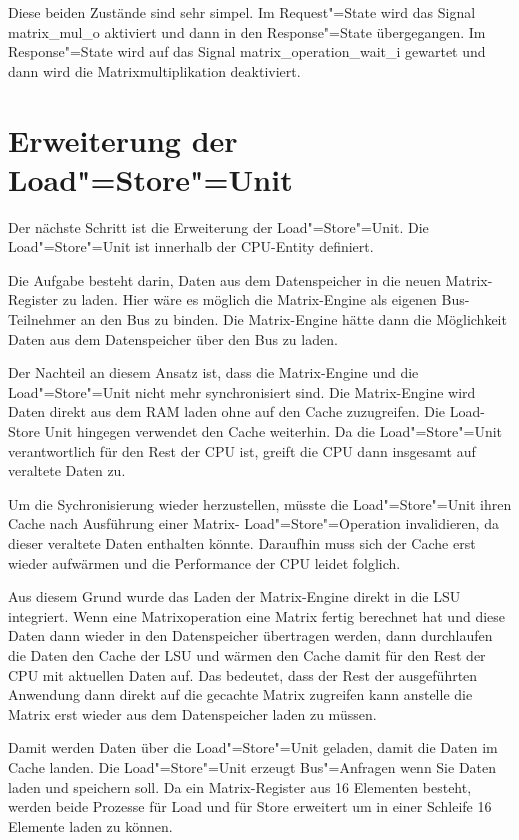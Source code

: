 Diese beiden Zustände sind sehr simpel. Im Request"=State wird das Signal matrix\_mul\_o aktiviert und dann in den Response"=State übergegangen. Im Response"=State wird auf das Signal matrix\_operation\_wait\_i gewartet und dann wird die Matrixmultiplikation deaktiviert.




\section{Erweiterung der Load"=Store"=Unit} \label{sec:neorv32-extending-LSU}

Der nächste Schritt ist die Erweiterung der Load"=Store"=Unit. Die Load"=Store"=Unit ist innerhalb der CPU-Entity definiert.

Die Aufgabe besteht darin, Daten aus dem Datenspeicher in die neuen Matrix-Register zu laden. Hier wäre es möglich die Matrix-Engine als eigenen Bus-Teilnehmer an den Bus zu binden. Die Matrix-Engine hätte dann die Möglichkeit Daten aus dem Datenspeicher über den Bus zu laden.

Der Nachteil an diesem Ansatz ist, dass die Matrix-Engine und die Load"=Store"=Unit nicht mehr synchronisiert sind. Die Matrix-Engine wird Daten direkt aus dem RAM laden ohne auf den Cache zuzugreifen. Die Load-Store Unit hingegen verwendet den Cache weiterhin. Da die Load"=Store"=Unit verantwortlich für den Rest der CPU ist, greift die CPU dann insgesamt auf veraltete Daten zu.

Um die Sychronisierung wieder herzustellen, müsste die Load"=Store"=Unit ihren Cache nach Ausführung einer Matrix- Load"=Store"=Operation invalidieren, da dieser veraltete Daten enthalten könnte. Daraufhin muss sich der Cache erst wieder aufwärmen und die Performance der CPU leidet folglich.

Aus diesem Grund wurde das Laden der Matrix-Engine direkt in die \gls{LSU} integriert. Wenn eine Matrixoperation eine Matrix fertig berechnet hat und diese Daten dann wieder in den Datenspeicher übertragen werden, dann durchlaufen die Daten den Cache der \gls{LSU} und wärmen den Cache damit für den Rest der CPU mit aktuellen Daten auf. Das bedeutet, dass der Rest der ausgeführten Anwendung dann direkt auf die gecachte Matrix zugreifen kann anstelle die Matrix erst wieder aus dem Datenspeicher laden zu müssen.

Damit werden Daten über die Load"=Store"=Unit geladen, damit die Daten im Cache landen. Die Load"=Store"=Unit erzeugt Bus"=Anfragen wenn Sie Daten laden und speichern soll. Da ein Matrix-Register aus 16 Elementen besteht, werden beide Prozesse für Load und für Store erweitert um in einer Schleife 16 Elemente laden zu können.

